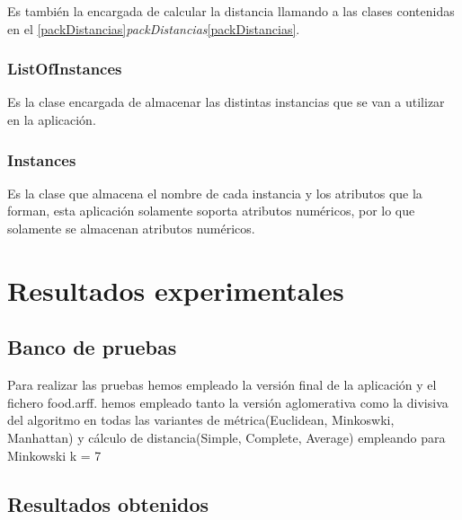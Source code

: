 \documentclass[11pt, titlepage,a4paper]{article}
\begin{document}
Es también la encargada de calcular la distancia llamando a las clases
contenidas en el
\ref{packDistancias}\textit{packDistancias}\ref{packDistancias}.

\subsubsection{ListOfInstances}
Es la clase encargada de almacenar las distintas instancias que se van a
utilizar en la aplicación.

\subsubsection{Instances}
Es la clase que almacena el nombre de cada instancia y los atributos que la
forman, esta aplicación solamente soporta atributos numéricos, por lo que
solamente se almacenan atributos numéricos.


\section{Resultados experimentales}

\subsection{Banco de pruebas}
Para realizar las pruebas hemos empleado la versión final de la aplicación y el
fichero food.arff. hemos empleado tanto la versión aglomerativa como la divisiva
del algoritmo en todas las variantes de métrica(Euclidean, Minkoswki, Manhattan)
y cálculo de distancia(Simple, Complete, Average) empleando para Minkowski k = 7


\subsection{Resultados obtenidos}
\end{document}
